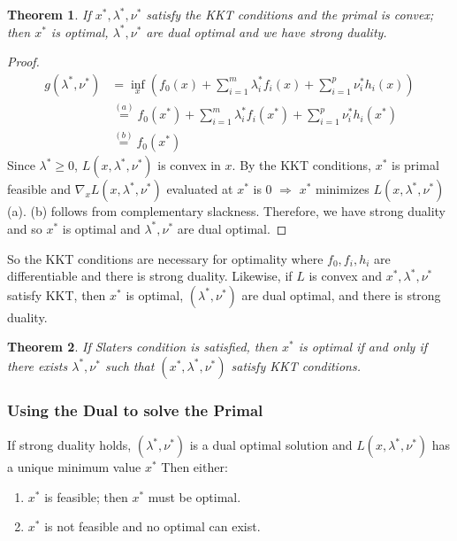 \documentclass[]{article}
\theoremstyle{mattstyle}
\newtheorem{theorem}{Theorem}[section]
\theoremstyle{definition}
\begin{document}
\begin{theorem}
	If $x^*, \lambda^*, \nu^*$ satisfy the KKT conditions and the primal is convex; then $x^*$ is optimal, $\lambda^*, \nu^*$ are dual optimal and we have strong duality.
\end{theorem}
\begin{proof}
	\begin{align}
	g(\lambda^*, \nu^*) &= \inf_x \left( f_0(x) + \sum_{i=1}^m \lambda_i^*f_i(x) + \sum_{i=1}^p \nu_i^* h_i(x) \right) \\
	&\overset{(a)}{=}f_0(x^*) + \sum_{i=1}^m \lambda_i^*f_i(x^*) + \sum_{i=1}^p \nu_i^* h_i(x^*)\\
	&\overset{(b)}{=}f_0(x^*)
	\end{align}
	Since $\lambda^*\ge0$, $L(x,\lambda^*,\nu^*)$ is convex in $x$. By the KKT conditions, $x^*$ is primal feasible and $\nabla_x L(x,\lambda^*,\nu^*)$ evaluated at $x^*$ is 0 $\Rightarrow$ $x^*$ minimizes $L(x,\lambda^*,\nu^*)$ (a). (b) follows from complementary slackness. Therefore, we have strong duality and so $x^*$ is optimal and $\lambda^*, \nu^*$ are dual optimal.
\end{proof}

So the KKT conditions are necessary for optimality where $f_0,f_i,h_i$ are differentiable and there is strong duality. Likewise, if $L$ is convex and $x^*,\lambda^*,\nu^*$ satisfy KKT, then $x^*$ is optimal, $(\lambda^*,\nu^*)$ are dual optimal, and there is strong duality.

\begin{theorem}
	If Slaters condition is satisfied, then $x^*$ is optimal if and only if there exists $\lambda^*, \nu^*$ such that $(x^*,\lambda^*, \nu^*)$ satisfy KKT conditions.
\end{theorem}

\subsubsection{Using the Dual to solve the Primal}

If strong duality holds, $(\lambda^*, \nu^*)$ is a dual optimal solution and $L(x, \lambda^*, \nu^*)$ has a unique minimum value $x^*$ Then either:
\begin{enumerate}
	\item $x^*$ is feasible; then $x^*$ must be optimal.
	\item $x^*$ is not feasible and no optimal can exist.
\end{enumerate}
\end{document}
